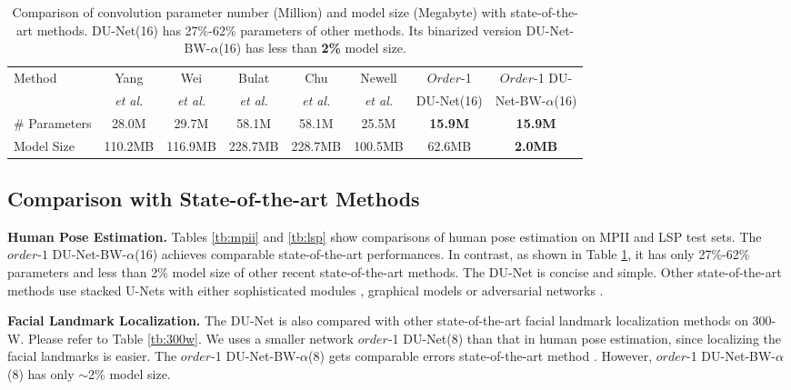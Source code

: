 \documentclass[runningheads]{llncs}
\begin{document}
\begin{table}[htb]
\begin{center}
\small
\caption{Comparison of convolution parameter number (Million) and model size (Megabyte) with state-of-the-art methods. DU-Net(16) has 27\%-62\% parameters of other methods. Its binarized version DU-Net-BW-$\alpha$(16) has less than {\bf 2\%} model size.}\label{tb:para-num}
\setlength\tabcolsep{0.5pt}
\begin{tabular}{lccccc|cc}
\toprule
\multirow{2}{*}{Method} & Yang  & Wei & Bulat  & Chu & Newell  & $Order$-1 & $Order$-1 DU-\\
& {\it et al.}\cite{yang2017learning} & {\it et al.}\cite{wei2016convolutional}  
& {\it et al.}\cite{bulat2016human} & {\it et al.}\cite{chu2017multi} & {\it et al.}\cite{newell2016stacked} & DU-Net(16) & Net-BW-$\alpha$(16)\\
\hline
\# Parameters & 28.0M & 29.7M & 58.1M & 58.1M & 25.5M & {\bf 15.9M} & {\bf 15.9M}\\
Model Size & 110.2MB & 116.9MB & 228.7MB & 228.7MB & 100.5MB & 62.6MB & {\bf 2.0MB}\\

\bottomrule
\end{tabular}
\end{center}
\end{table}

\subsection{Comparison with State-of-the-art Methods}



{\bf Human Pose Estimation.}
Tables \ref{tb:mpii} and \ref{tb:lsp} show comparisons of human pose estimation on MPII and LSP test sets. The $order$-$1$  DU-Net-BW-$\alpha$(16) achieves comparable state-of-the-art performances. In contrast, as shown in Table \ref{tb:para-num}, it has only 27\%-62\% parameters and less than 2\% model size of other recent state-of-the-art methods. The DU-Net is concise and simple. Other state-of-the-art methods use stacked U-Nets with either sophisticated modules \cite{yang2017learning}, graphical models \cite{chu2017multi} or adversarial networks \cite{yu2017adversarial}.

{\bf Facial Landmark Localization.}
The DU-Net is also compared with other state-of-the-art facial landmark localization methods on 300-W. Please refer to Table \ref{tb:300w}. We uses a smaller network $order$-1 DU-Net(8) than that in human pose estimation, since localizing the facial landmarks is easier. The $order$-1 DU-Net-BW-$\alpha$(8) gets comparable errors state-of-the-art method \cite{newell2016stacked}. However, $order$-1 DU-Net-BW-$\alpha$(8) has only $\sim$2\% model size.
\end{document}
